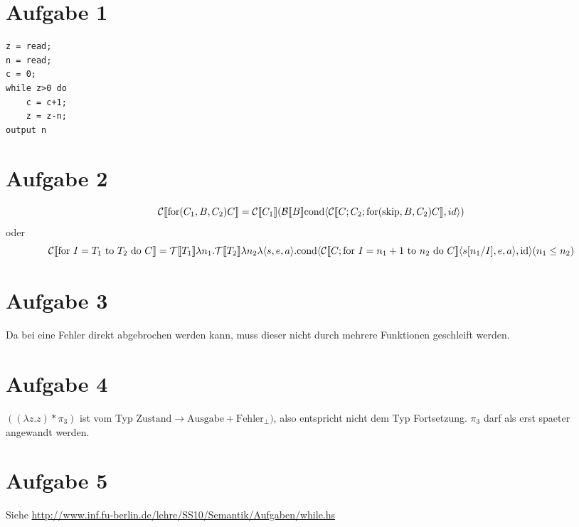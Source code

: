 




\newcommand{\nr}{11}


\section*{Aufgabe 1}
\begin{verbatim}
z = read;
n = read;
c = 0;
while z>0 do
    c = c+1;
    z = z-n;
output n
\end{verbatim}

\newpage

\section*{Aufgabe 2}
\begin{equation}
{\mathcal{C}\llbracket\text{for}(C_1, B, C_2) C\rrbracket} = {\mathcal{C}\llbracket C_1\rrbracket} ({\mathcal{B}\llbracket B \rrbracket} \text{cond}\langle {\mathcal{C}\llbracket C; C_2; \text{for}(\text{skip},B,C_2)C\rrbracket} , id\rangle )
\end{equation}
oder
\begin{equation}
{\mathcal{C}\llbracket\text{for }I = T_1 \text{ to } T_2 \text{ do } C\rrbracket} = 
{\mathcal{T}\llbracket T_1\rrbracket} \lambda n_1 . {\mathcal{T}\llbracket T_2\rrbracket} \lambda n_2 \lambda \langle s,e,a\rangle . \text{cond}\langle {\mathcal{C}\llbracket C ; \text{for }I = n_1+1 \text{ to } n_2 \text{ do } C\rrbracket} \langle s[n_1/I],e,a\rangle, \text{id}\rangle (n_1\leq n_2)
\end{equation}

\section*{Aufgabe 3}
Da bei eine Fehler direkt abgebrochen werden kann, muss dieser nicht durch mehrere Funktionen geschleift werden.

\section*{Aufgabe 4}
$( (\lambda z. z) * \pi_3 )$ ist vom Typ $ \text{Zustand} \to \text{Ausgabe}+\text{Fehler}_\bot)$, also entspricht nicht dem Typ Fortsetzung.
$\pi_3$ darf als erst spaeter angewandt werden.

\section*{Aufgabe 5}
Siehe \url{http://www.inf.fu-berlin.de/lehre/SS10/Semantik/Aufgaben/while.hs}


